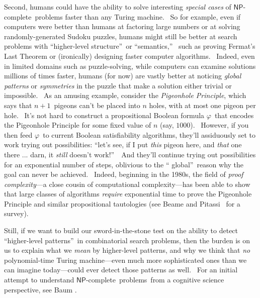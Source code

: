\documentclass[12pt,onecolumn]{article}%
\begin{document}
Second, humans could have the ability to solve interesting \textit{special
cases} of $\mathsf{NP}$-complete\ problems faster than any Turing machine.
\ So for example, even if computers were better than humans at factoring large
numbers or at solving randomly-generated Sudoku puzzles, humans might still be
better at search problems with \textquotedblleft higher-level
structure\textquotedblright\ or \textquotedblleft semantics,\textquotedblright%
\ such as proving Fermat's Last Theorem or (ironically) designing faster
computer algorithms. \ Indeed, even in limited domains such as puzzle-solving,
while computers can examine solutions millions of times faster, humans (for
now) are vastly better at noticing \textit{global patterns} or
\textit{symmetries} in the puzzle that make a solution either trivial or
impossible. \ As an amusing example, consider the \textit{Pigeonhole
Principle}, which says that $n+1$\ pigeons can't be placed into $n$ holes,
with at most one pigeon per hole. \ It's not hard to construct a propositional
Boolean formula $\varphi$\ that encodes the Pigeonhole Principle for some
fixed value of $n$ (say, $1000$). \ However, if you then feed $\varphi$\ to
current Boolean satisfiability algorithms, they'll assiduously set to work
trying out possibilities: \textquotedblleft let's see, if I put \textit{this}
pigeon here, and \textit{that} one there ... darn, it \textit{still} doesn't
work!\textquotedblright\ \ And they'll continue trying out possibilities for
an exponential number of steps, oblivious to the \textquotedblleft
global\textquotedblright\ reason why the goal can never be achieved. \ Indeed,
beginning in the 1980s, the field of \textit{proof complexity}---a close
cousin of computational complexity---has been able to show that large classes
of algorithms \textit{require} exponential time to prove the Pigeonhole
Principle and similar propositional tautologies (see Beame and Pitassi
\cite{beamepitassi}\ for a survey).

Still, if we want to build our sword-in-the-stone test on the ability to
detect \textquotedblleft higher-level patterns\textquotedblright\ in
combinatorial search problems, then the burden is on us to explain what we
\textit{mean} by higher-level patterns, and why we think that \textit{no}
polynomial-time Turing machine---even much more sophisticated ones than we can
imagine today---could ever detect those patterns as well. \ For an initial
attempt to understand $\mathsf{NP}$-complete\ problems\ from a cognitive
science perspective, see Baum \cite{baum}.
\end{document}
